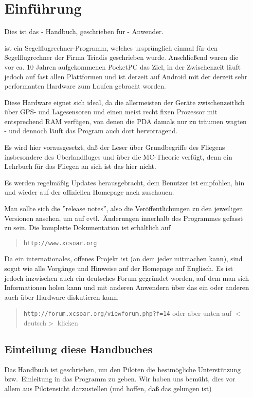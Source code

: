 \chapter{Einführung}\label{cha:introduction}
Dies ist das \xc - Handbuch, geschrieben für \xc - Anwender.


\xc ist ein Segelflugrechner-Programm, welches ursprünglich einmal für den Segelflugrechner \al der Firma Triadis geschrieben wurde.
Anschließend waren die vor ca. 10 Jahren aufgekommenen PocketPC das Ziel, in der Zwischenzeit läuft \xc jedoch auf fast allen Plattformen und ist derzeit auf Android mit der derzeit
sehr performanten Hardware zum Laufen gebracht worden.

Diese Hardware eignet sich ideal, da die allermeisten der Geräte zwischenzeitlich über GPS- und Lagesensoren und einen
meist recht fixen Prozessor mit entsprechend RAM verfügen, von denen die PDA damals nur zu träumen wagten - und dennoch
läuft das Program auch dort hervorragend.


Es wird hier vorausgesetzt, daß der Leser über Grundbegriffe des Fliegens insbesondere des Überlandfluges
und über die MC-Theorie verfügt, denn ein Lehrbuch für das Fliegen an sich ist das hier nicht.


Es werden regelmäßig Updates herausgebracht, dem Benutzer ist empfohlen, hin und wieder auf der offiziellen Homepage nach zuschauen.

Man sollte sich die ''release notes'', also die Veröffentlichungen zu den jeweiligen Versionen ansehen, um  auf evtl.\ Änderungen innerhalb des Programmes gefasst zu sein.
Die komplette Dokumentation ist erhältlich auf

\begin{quote}
{\tt http://www.xcsoar.org}
\end{quote}

Da \xc ein internationales, offenes Projekt ist (an dem jeder mitmachen kann), sind sogut wie alle Vorgänge und Hinweise auf der Homepage auf Englisch.
Es ist jedoch inzwischen auch ein deutsches Forum gegründet worden, auf dem man sich Informationen holen kann und mit anderen Anwendern über das ein oder anderen auch über Hardware diskutieren kann.

\begin{quote}
{\tt http://forum.xcsoar.org/viewforum.php?f=14}  \qquad oder aber unten auf $<$deutsch$>$ klicken
\end{quote}


\section{Einteilung diese Handbuches}
Das Handbuch ist geschrieben, um den Piloten die bestmögliche Unterstützung bzw.\ Einleitung in das Programm zu geben.
Wir haben uns bemüht, dies vor allem aus Pilotensicht darzustellen (und hoffen, daß das gelungen ist)

